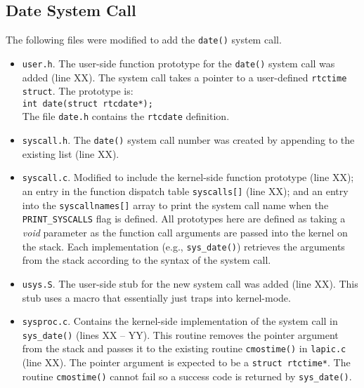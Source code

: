 \documentclass[11pt,letterpaper]{report}
\begin{document}
	\subsection*{Date System Call}
	The following files were modified to add the {\tt date()} system call.
	
	\begin{itemize}

	\item {\tt user.h}. The user-side function prototype for the {\tt date()} system call was added ({\color{red}line XX}). The system call takes a pointer to a user-defined {\tt rtctime struct}. The prototype is:\\
	{\tt int date(struct rtcdate*);} \\
	The file {\tt date.h} contains the {\tt rtcdate} definition.
	
	\item {\tt syscall.h}. The {\tt date()} system call number was created by appending to the existing list ({\color{red}line XX}).
	
	\item {\tt syscall.c}. Modified to include the kernel-side function prototype ({\color{red}line XX}); an entry in the function dispatch table {\tt syscalls[]} ({\color{red}line XX}); and an entry into the {\tt syscallnames[]} array to print the system call name when the {\tt PRINT\_SYSCALLS} flag is defined. All prototypes here are defined as taking a \emph{void} parameter as the function call arguments are passed into the kernel on the stack. Each implementation (e.g., {\tt sys\_date()})  retrieves the arguments from the stack according to the syntax of the system call.
	
	\item {\tt usys.S}. The user-side stub for the new system call was added ({\color{red}line XX}). This stub uses a macro that essentially just traps into kernel-mode.
	
	\item {\tt sysproc.c}. Contains the kernel-side implementation  of the system call in {\tt sys\_date()} ({\color{red}lines XX -- YY}). This routine removes the pointer argument from the stack and passes it to the existing routine {\tt cmostime()} in {\tt lapic.c} ({\color{red}line XX}). The pointer argument is expected to be a {\tt struct rtctime*}. The routine {\tt cmostime()} cannot fail so a success code is returned by {\tt sys\_date()}.
	
	\end{itemize}
	
\end{document}
